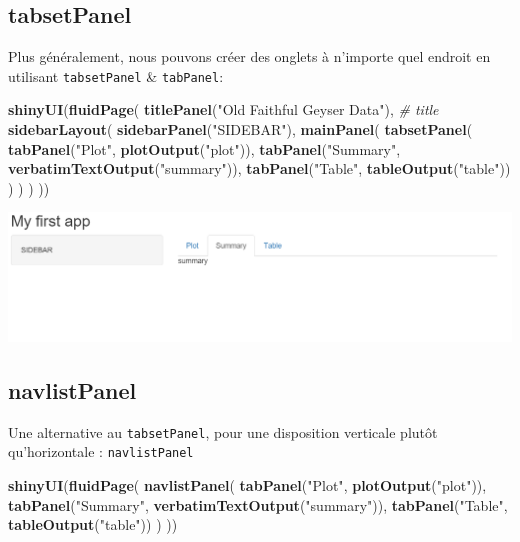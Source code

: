 \documentclass[]{article}
\newenvironment{Shaded}{\begin{snugshade}}{\end{snugshade}}
\newcommand{\KeywordTok}[1]{\textcolor[rgb]{0.13,0.29,0.53}{\textbf{#1}}}
\newcommand{\StringTok}[1]{\textcolor[rgb]{0.31,0.60,0.02}{#1}}
\newcommand{\CommentTok}[1]{\textcolor[rgb]{0.56,0.35,0.01}{\textit{#1}}}
\newcommand{\NormalTok}[1]{#1}
\begin{document}
\subsection{tabsetPanel}\label{tabsetpanel}

Plus généralement, nous pouvons créer des onglets à n'importe quel
endroit en utilisant \texttt{tabsetPanel} \& \texttt{tabPanel}:

\begin{Shaded}
\begin{Highlighting}[]
\KeywordTok{shinyUI}\NormalTok{(}\KeywordTok{fluidPage}\NormalTok{(}
  \KeywordTok{titlePanel}\NormalTok{(}\StringTok{"Old Faithful Geyser Data"}\NormalTok{), }\CommentTok{# title}
  \KeywordTok{sidebarLayout}\NormalTok{(}
    \KeywordTok{sidebarPanel}\NormalTok{(}\StringTok{"SIDEBAR"}\NormalTok{),}
    \KeywordTok{mainPanel}\NormalTok{(}
      \KeywordTok{tabsetPanel}\NormalTok{(}
        \KeywordTok{tabPanel}\NormalTok{(}\StringTok{"Plot"}\NormalTok{, }\KeywordTok{plotOutput}\NormalTok{(}\StringTok{"plot"}\NormalTok{)), }
        \KeywordTok{tabPanel}\NormalTok{(}\StringTok{"Summary"}\NormalTok{, }\KeywordTok{verbatimTextOutput}\NormalTok{(}\StringTok{"summary"}\NormalTok{)), }
        \KeywordTok{tabPanel}\NormalTok{(}\StringTok{"Table"}\NormalTok{, }\KeywordTok{tableOutput}\NormalTok{(}\StringTok{"table"}\NormalTok{))}
\NormalTok{      )}
\NormalTok{    )}
\NormalTok{  )}
\NormalTok{))}
\end{Highlighting}
\end{Shaded}

\includegraphics{img/tabpanel.png}

\subsection{navlistPanel}\label{navlistpanel}

Une alternative au \texttt{tabsetPanel}, pour une disposition verticale
plutôt qu'horizontale : \texttt{navlistPanel}

\begin{Shaded}
\begin{Highlighting}[]
\KeywordTok{shinyUI}\NormalTok{(}\KeywordTok{fluidPage}\NormalTok{(}
  \KeywordTok{navlistPanel}\NormalTok{(}
    \KeywordTok{tabPanel}\NormalTok{(}\StringTok{"Plot"}\NormalTok{, }\KeywordTok{plotOutput}\NormalTok{(}\StringTok{"plot"}\NormalTok{)), }
    \KeywordTok{tabPanel}\NormalTok{(}\StringTok{"Summary"}\NormalTok{, }\KeywordTok{verbatimTextOutput}\NormalTok{(}\StringTok{"summary"}\NormalTok{)), }
    \KeywordTok{tabPanel}\NormalTok{(}\StringTok{"Table"}\NormalTok{, }\KeywordTok{tableOutput}\NormalTok{(}\StringTok{"table"}\NormalTok{))}
\NormalTok{  )}
\NormalTok{))}
\end{Highlighting}
\end{Shaded}
\end{document}
